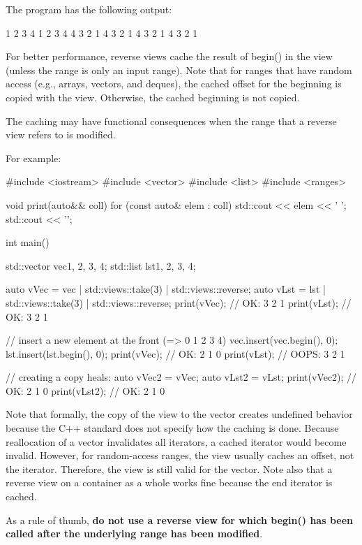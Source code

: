 The program has the following output:

\begin{shell}
1 2 3 4 1 2 3 4
4 3 2 1 4 3 2 1
4 3 2 1 4 3 2 1
\end{shell}


For better performance, reverse views cache the result of begin() in the view (unless the range is only an input range).
Note that for ranges that have random access (e.g., arrays, vectors, and deques), the cached offset for the beginning is copied with the view. Otherwise, the cached beginning is not copied.

The caching may have functional consequences when the range that a reverse view refers to is modified.

For example:


\begin{cpp}
#include <iostream>
#include <vector>
#include <list>
#include <ranges>

void print(auto&& coll)
{
	for (const auto& elem : coll) {
		std::cout << elem << ' ';
	}
	std::cout << '\n';
}

int main()
{
	std::vector vec{1, 2, 3, 4};
	std::list lst{1, 2, 3, 4};
	
	auto vVec = vec | std::views::take(3) | std::views::reverse;
	auto vLst = lst | std::views::take(3) | std::views::reverse;
	print(vVec); // OK: 3 2 1
	print(vLst); // OK: 3 2 1
	
	// insert a new element at the front (=> 0 1 2 3 4)
	vec.insert(vec.begin(), 0);
	lst.insert(lst.begin(), 0);
	print(vVec); // OK: 2 1 0
	print(vLst); // OOPS: 3 2 1
	
	// creating a copy heals:
	auto vVec2 = vVec;
	auto vLst2 = vLst;
	print(vVec2); // OK: 2 1 0
	print(vLst2); // OK: 2 1 0
}
\end{cpp}

Note that formally, the copy of the view to the vector creates undefined behavior because the C++ standard does not specify how the caching is done. Because reallocation of a vector invalidates all iterators, a cached iterator would become invalid. However, for random-access ranges, the view usually caches an offset, not the iterator. Therefore, the view is still valid for the vector.
Note also that a reverse view on a container as a whole works fine because the end iterator is cached.

As a rule of thumb, \textbf{do not use a reverse view for which begin() has been called after the underlying range has been modified}.

